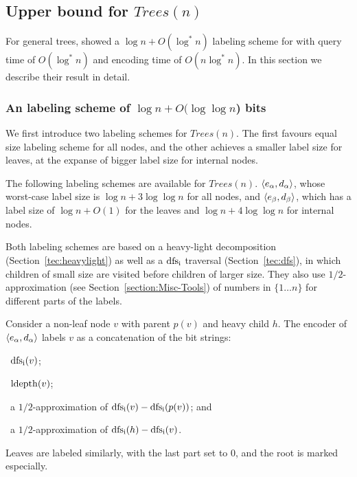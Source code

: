 \subsection{Upper bound for $Trees(n)$ }\label{sec-adj-lb}
For general trees,   showed a $\log n+{O}(\log^* n)$ labeling scheme for \adjacency with query time of $O(\log^* n)$ and encoding time of $O(n \log^*n)$.
In this section we describe their result in detail.

\subsubsection{An \adjacency labeling scheme of $\log n +O(\log \log n$) bits}\label{sec-adj-simple}
We first introduce two labeling schemes for $Trees(n)$.
The first favours equal size labeling scheme for all nodes, and the other   achieves a smaller label size for leaves, at the expanse of bigger label size for internal nodes.
\begin{lemma} \cite{Alstrup02}\label{lem:4loglogn}\label{Lemma-adj-loglogn}
The following  \adjacency labeling schemes are available for  $Trees(n)$.
$ \left \langle e_\alpha,d_\alpha \right \rangle $, whose worst-case label size is  $\log n + 3\log \log n $ for all nodes, and $ \left \langle e_\beta,d_\beta \right \rangle $, which has a label size of  $\log n +O(1)$ for the leaves and $\log n + 4\log \log n$ for internal  nodes.
\end{lemma}
 
Both labeling schemes are based on a heavy-light decomposition (Section~\ref{tec:heavylight}) as well as a $\operatorname{dfs_i}$ traversal (Section~\ref{tec:dfs}), in which children of small size are visited before children of larger size.
They also use $1/2$-approximation (see Section~\ref{section:Misc-Tools}) of  numbers in $\{1 \dots n\}$ for different parts of the labels.

Consider a non-leaf  node $v$ with parent $p(v)$ and heavy child $h$.
The encoder of $\left \langle e_\alpha,d_\alpha \right \rangle $ labels $v$ as a concatenation of  the bit strings:
\begin{inparaenum}
  \item~$\operatorname{dfs_i}(v)$;
 \item~$\operatorname{ldepth}(v)$;
 \item~a $1/2$-approximation of $\operatorname{dfs_i}(v)-\operatorname{dfs_i}(p(v))$; and
\item~a $1/2$-approximation of $\operatorname{dfs_i}(h)-\operatorname{dfs_i}(v)$.
 \end{inparaenum}
Leaves are labeled similarly, with  the last part set to $0$, and the root is marked especially.

